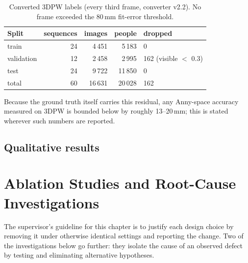 \begin{table}[h]
\centering\small
\begin{tabular}{lrrrl}
\toprule
Split & sequences & images & people & dropped \\
\midrule
train & 24 & 4\,451 & 5\,183 & 0 \\
validation & 12 & 2\,458 & 2\,995 & 162 (visible $<$ 0.3) \\
test & 24 & 9\,722 & 11\,850 & 0 \\
\midrule
total & 60 & 16\,631 & 20\,028 & 162 \\
\bottomrule
\end{tabular}
\caption{Converted 3DPW labels (every third frame, converter v2.2). No frame
exceeded the 80\,mm fit-error threshold.}
\label{tab:labels}
\end{table}

Because the ground truth itself carries this residual, any Anny-space
accuracy measured on 3DPW is bounded below by roughly 13--20\,mm; this is
stated wherever such numbers are reported.

\section{Qualitative results}



\chapter{Ablation Studies and Root-Cause Investigations}
\label{ch:ablation}

The supervisor's guideline for this chapter is to justify each design choice by
removing it under otherwise identical settings and reporting the change. Two of
the investigations below go further: they isolate the cause of an observed
defect by testing and eliminating alternative hypotheses.

